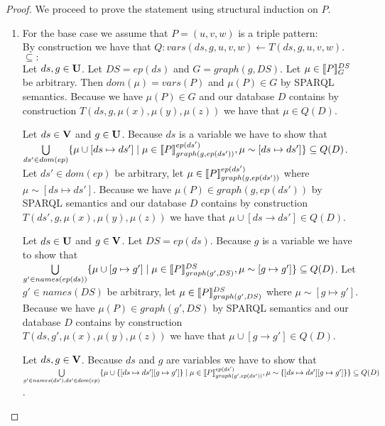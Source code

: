 \begin{proof}
	We proceed to prove the statement using structural induction on $P$.
	\noindent 
	\begin{enumerate}
		\item  For the base case we assume that $P=(u,v,w)$ is a triple pattern:\\
			By construction we have that $Q: vars(ds,g,u,v,w) \leftarrow
			T(ds,g,u,v,w)$.\\
			$\subseteq:$\\

			Let $ds,g \in \mathbf{U}$. Let $DS = ep(ds)$ and $G = graph(g,DS)$.
			Let $\mu \in \llbracket P \rrbracket^{DS}_{G}$ be arbitrary. 
			Then $dom(\mu) = vars(P)$ and $\mu(P) \in G$ by SPARQL semantics. 
			Because we have $\mu(P) \in G$ and our database $D$ contains by
			construction $T(ds,g,\mu(x),\mu(y),\mu(z))$ we have that $\mu \in Q(D)$.

			\bigskip\noindent
			Let $ds \in \mathbf{V}$ and $g \in \mathbf{U}$. 
			Because $ds$ is a variable we have to show that 
			$\bigcup\limits_{ds' \in dom(ep)} \{ \mu \cup [ds \mapsto ds'] \mid \mu \in \llbracket P
			\rrbracket^{ep(ds')}_{graph(g,ep(ds'))},\mu \sim [ds \mapsto ds']\} \subseteq Q(D)$. 
			Let $ds' \in dom(ep)$ be arbitrary, let $\mu \in \llbracket P
			\rrbracket^{ep(ds')}_{graph(g,ep(ds'))}$ where $\mu \sim [ds \mapsto ds']$.
			Because we have $\mu(P) \in graph(g,ep(ds'))$ by SPARQL semantics and our database
			$D$ contains by construction\\ $T(ds',g,\mu(x),\mu(y),\mu(z))$ we have that
			$\mu \cup [ds \rightarrow ds'] \in Q(D)$. 

			\bigskip\noindent
			Let $ds \in \mathbf{U}$ and $g \in \mathbf{V}$. Let $DS = ep(ds)$. 
			Because $g$ is a variable we have to show that 
			$\bigcup\limits_{g' \in names(ep(ds))} \{ \mu \cup [g \mapsto g'] \mid \mu \in \llbracket P
			\rrbracket^{DS}_{graph(g',DS)},\mu \sim [g \mapsto g']\} \subseteq Q(D)$.
			Let $g' \in names(DS)$ be arbitrary, let $\mu \in \llbracket P
			\rrbracket^{DS}_{graph(g',DS)}$ where $\mu \sim [g \mapsto g']$.
			Because we have $\mu(P) \in graph(g',DS)$ by SPARQL semantics and our database
			$D$ contains by construction\\ 
			$T(ds,g',\mu(x),\mu(y),\mu(z))$ we have that $\mu \cup [g
			\rightarrow g'] \in Q(D)$. 

			\bigskip\noindent
			Let $ds,g \in \mathbf{V}$.
			Because $ds$ and $g$ are variables we have to show that 
			$\bigcup\limits_{g' \in names(ds'), ds'\in dom(ep)} \{ \mu \cup \{[ds\mapsto ds'] [g
				\mapsto g']\} \mid \mu \in \llbracket P
				\rrbracket^{ep(ds')}_{graph(g',ep(ds'))},\mu 
			\sim \{[ds \mapsto ds'][g \mapsto g']\}\} \subseteq Q(D)$. 


\end{enumerate}
\end{proof}
